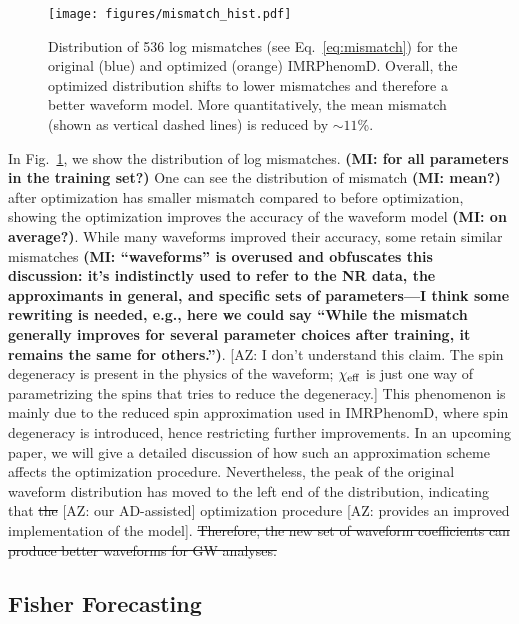 \documentclass[twocolumn]{aastex631}
\newcommand{\AZ}[1]{{\color{Burnt}[AZ: #1]}}
\newcommand{\mi}[1]{\textbf{\color{teal}(MI: #1)}}
\begin{document}
\begin{figure}[t]
	\begin{centering}
		\texttt{[image: figures/mismatch\_hist.pdf]}
		\caption{
			Distribution of 536 log mismatches (see Eq.~\ref{eq:mismatch}) for the original (blue) and optimized (orange) IMRPhenomD. 
            Overall, the optimized distribution shifts to lower mismatches and therefore a better waveform model. 
            More quantitatively, the mean mismatch (shown as vertical dashed lines) is reduced by $\sim11$\%.
		}
		\label{fig:mismatch_hist}
	\end{centering}
\end{figure}
 
In Fig.~\ref{fig:mismatch_hist}, we show the distribution of log mismatches.
\mi{for all parameters in the training set?}
One can see the distribution of mismatch \mi{mean?} after optimization has smaller mismatch compared to before optimization,
showing the optimization improves the accuracy of the waveform model \mi{on average?}.
While many waveforms improved their accuracy, some retain similar mismatches \mi{``waveforms'' is overused and obfuscates this discussion: it's indistinctly used to refer to the NR data, the approximants in general, and specific sets of parameters---I think some rewriting is needed, e.g., here we could say ``While the mismatch generally improves for several parameter choices after training, it remains the same for others.''}. 
\AZ{I don't understand this claim. The spin degeneracy is present in the physics of the waveform; $\chi_{\rm eff}$ is just one way of parametrizing the spins that tries to reduce the degeneracy.}
This phenomenon is mainly due to the reduced spin approximation used in IMRPhenomD, where spin degeneracy is introduced, hence restricting further improvements. 
In an upcoming paper, we will give a detailed discussion of how such an approximation scheme affects the optimization procedure. 
Nevertheless, the peak of the original waveform distribution has moved to the left end of the distribution, indicating that \sout{the} \AZ{our AD-assisted} optimization procedure \AZ{provides an improved implementation of the model}. 
\sout{Therefore, the new set of waveform coefficients can produce better waveforms for GW analyses. }

\subsection{Fisher Forecasting}
\label{subsec:fisher}
\end{document}
